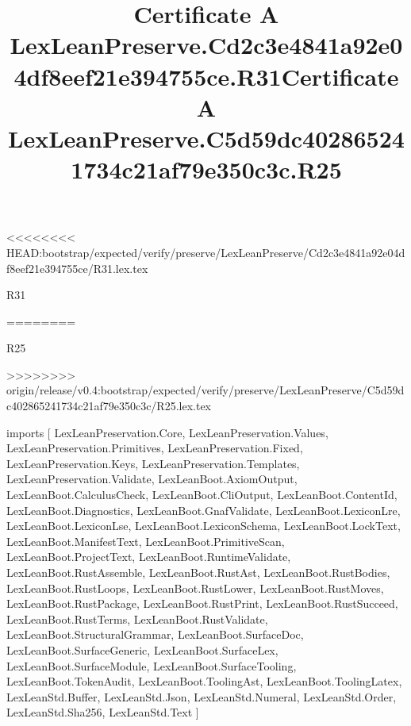 <<<<<<<< HEAD:bootstrap/expected/verify/preserve/LexLeanPreserve/Cd2c3e4841a92e04df8eef21e394755ce/R31.lex.tex
\begin{lexlean}{R31}
\title{Certificate A LexLeanPreserve.Cd2c3e4841a92e04df8eef21e394755ce.R31}
========
\begin{lexlean}{R25}
\title{Certificate A LexLeanPreserve.C5d59dc402865241734c21af79e350c3c.R25}
>>>>>>>> origin/release/v0.4:bootstrap/expected/verify/preserve/LexLeanPreserve/C5d59dc402865241734c21af79e350c3c/R25.lex.tex
\begin{coremodule}
imports [
  LexLeanPreservation.Core,
  LexLeanPreservation.Values,
  LexLeanPreservation.Primitives,
  LexLeanPreservation.Fixed,
  LexLeanPreservation.Keys,
  LexLeanPreservation.Templates,
  LexLeanPreservation.Validate,
  LexLeanBoot.AxiomOutput,
  LexLeanBoot.CalculusCheck,
  LexLeanBoot.CliOutput,
  LexLeanBoot.ContentId,
  LexLeanBoot.Diagnostics,
  LexLeanBoot.GnafValidate,
  LexLeanBoot.LexiconLre,
  LexLeanBoot.LexiconLse,
  LexLeanBoot.LexiconSchema,
  LexLeanBoot.LockText,
  LexLeanBoot.ManifestText,
  LexLeanBoot.PrimitiveScan,
  LexLeanBoot.ProjectText,
  LexLeanBoot.RuntimeValidate,
  LexLeanBoot.RustAssemble,
  LexLeanBoot.RustAst,
  LexLeanBoot.RustBodies,
  LexLeanBoot.RustLoops,
  LexLeanBoot.RustLower,
  LexLeanBoot.RustMoves,
  LexLeanBoot.RustPackage,
  LexLeanBoot.RustPrint,
  LexLeanBoot.RustSucceed,
  LexLeanBoot.RustTerms,
  LexLeanBoot.RustValidate,
  LexLeanBoot.StructuralGrammar,
  LexLeanBoot.SurfaceDoc,
  LexLeanBoot.SurfaceGeneric,
  LexLeanBoot.SurfaceLex,
  LexLeanBoot.SurfaceModule,
  LexLeanBoot.SurfaceTooling,
  LexLeanBoot.TokenAudit,
  LexLeanBoot.ToolingAst,
  LexLeanBoot.ToolingLatex,
  LexLeanStd.Buffer,
  LexLeanStd.Json,
  LexLeanStd.Numeral,
  LexLeanStd.Order,
  LexLeanStd.Sha256,
  LexLeanStd.Text
]


\end{coremodule}
\end{lexlean}
\end{lexlean}
